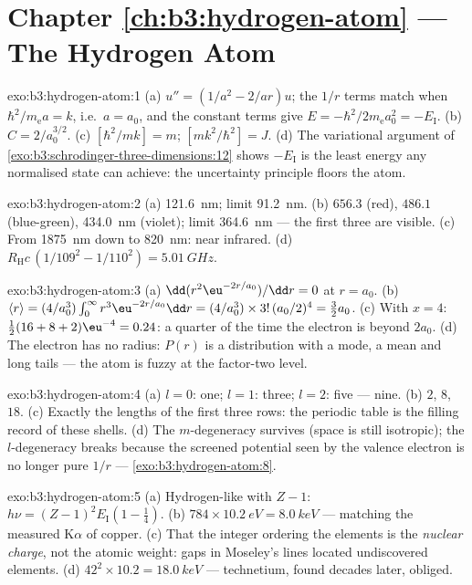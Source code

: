 \section*{Chapter \ref{ch:b3:hydrogen-atom} --- The Hydrogen Atom}

\begin{solution}{exo:b3:hydrogen-atom:1}
(a) $u'' = (1/a^2 - 2/ar)u$; the $1/r$ terms match when
$\hbar^2/m_{\text{e}}a = k$, i.e.\ $a = a_0$, and the constant terms
give $E = -\hbar^2/2m_{\text{e}}a_0^2 = -E_{\text{I}}$. (b) $C =
2/a_0^{3/2}$. (c) $[\hbar^2/mk] = \unit{m}$; $[mk^2/\hbar^2] =
\unit{J}$. (d) The variational argument of
\cref{exo:b3:schrodinger-three-dimensions:12} shows $-E_{\text{I}}$
is the least energy any normalised state can achieve: the
uncertainty principle floors the atom.
\end{solution}

\begin{solution}{exo:b3:hydrogen-atom:2}
(a) \qty{121.6}{nm}; limit \qty{91.2}{nm}. (b) $656.3$ (red),
$486.1$ (blue-green), \qty{434.0}{nm} (violet); limit
\qty{364.6}{nm} --- the first three are visible. (c) From
\qty{1875}{nm} down to \qty{820}{nm}: near infrared. (d)
$R_{\text{H}}c\,(1/109^2 - 1/110^2) = \qty{5.01}{GHz}$.
\end{solution}

\begin{solution}{exo:b3:hydrogen-atom:3}
(a) $\dd(r^2\eu^{-2r/a_0})/\dd r = 0$ at $r = a_0$. (b) $\langle r\rangle = (4/a_0^3)\int_0^\infty
r^3\eu^{-2r/a_0}\dd r = (4/a_0^3)\times 3!\,(a_0/2)^4 = \tfrac32
a_0$. (c) With $x = 4$:
$\tfrac12(16 + 8 + 2)\eu^{-4} = 0.24$: a quarter of the time the
electron is beyond $2a_0$. (d) The electron has no radius: $P(r)$
is a distribution with a mode, a mean and long tails --- the atom
is fuzzy at the factor-two level.
\end{solution}

\begin{solution}{exo:b3:hydrogen-atom:4}
(a) $l = 0$: one; $l = 1$: three; $l = 2$: five --- nine. (b) $2$,
$8$, $18$. (c) Exactly the lengths of the first three rows: the
periodic table is the filling record of these shells. (d) The
$m$-degeneracy survives (space is still isotropic); the
$l$-degeneracy breaks because the screened potential seen by the
valence electron is no longer pure $1/r$ ---
\cref{exo:b3:hydrogen-atom:8}.
\end{solution}

\begin{solution}{exo:b3:hydrogen-atom:5}
(a) Hydrogen-like with $Z - 1$: $h\nu = (Z-1)^2E_{\text{I}}(1 -
\tfrac14)$. (b) $784 \times \qty{10.2}{eV} = \qty{8.0}{keV}$ ---
matching the measured K$\alpha$ of copper. (c) That the integer
ordering the elements is the \emph{nuclear charge}, not the atomic
weight: gaps in Moseley's lines located undiscovered elements. (d)
$42^2 \times 10.2 = \qty{18.0}{keV}$ --- technetium, found decades
later, obliged.
\end{solution}


